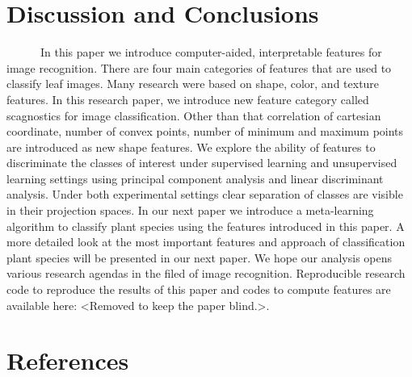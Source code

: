 \documentclass{article}
\begin{document}
\hypertarget{discussion-and-conclusions}{%
\section{Discussion and Conclusions}\label{discussion-and-conclusions}}

~~~~~~In this paper we introduce computer-aided, interpretable features
for image recognition. There are four main categories of features that
are used to classify leaf images. Many research were based on shape,
color, and texture features. In this research paper, we introduce new
feature category called scagnostics for image classification. Other than
that correlation of cartesian coordinate, number of convex points,
number of minimum and maximum points are introduced as new shape
features. We explore the ability of features to discriminate the classes
of interest under supervised learning and unsupervised learning settings
using principal component analysis and linear discriminant analysis.
Under both experimental settings clear separation of classes are visible
in their projection spaces. In our next paper we introduce a
meta-learning algorithm to classify plant species using the features
introduced in this paper. A more detailed look at the most important
features and approach of classification plant species will be presented
in our next paper. We hope our analysis opens various research agendas
in the filed of image recognition. Reproducible research code to
reproduce the results of this paper and codes to compute features are
available here: \textless Removed to keep the paper blind.\textgreater.

\hypertarget{references}{%
\section*{References}\label{references}}
\end{document}

